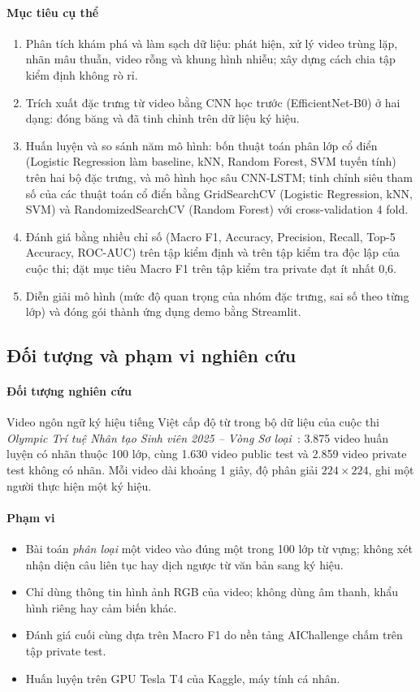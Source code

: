 \paragraph*{Mục tiêu cụ thể}
\begin{enumerate}[label=(\arabic*)]
  \item Phân tích khám phá và làm sạch dữ liệu: phát hiện, xử lý video trùng lặp, nhãn mâu thuẫn, video rỗng và khung hình nhiễu; xây dựng cách chia tập kiểm định không rò rỉ.
  \item Trích xuất đặc trưng từ video bằng CNN học trước (EfficientNet-B0) ở hai dạng: đóng băng và đã tinh chỉnh trên dữ liệu ký hiệu.
  \item Huấn luyện và so sánh năm mô hình: bốn thuật toán phân lớp cổ điển (Logistic Regression làm baseline, kNN, Random Forest, SVM tuyến tính) trên hai bộ đặc trưng, và mô hình học sâu CNN-LSTM; tinh chỉnh siêu tham số của các thuật toán cổ điển bằng GridSearchCV (Logistic Regression, kNN, SVM) và RandomizedSearchCV (Random Forest) với cross-validation 4 fold.
  \item Đánh giá bằng nhiều chỉ số (Macro F1, Accuracy, Precision, Recall, Top-5 Accuracy, ROC-AUC) trên tập kiểm định và trên tập kiểm tra độc lập của cuộc thi; đặt mục tiêu Macro F1 trên tập kiểm tra private đạt ít nhất 0,6.
  \item Diễn giải mô hình (mức độ quan trọng của nhóm đặc trưng, sai số theo từng lớp) và đóng gói thành ứng dụng demo bằng Streamlit.
\end{enumerate}

\subsection{Đối tượng và phạm vi nghiên cứu}
\label{subsec:scope}

\paragraph*{Đối tượng nghiên cứu} Video ngôn ngữ ký hiệu tiếng Việt cấp độ từ trong bộ dữ liệu của cuộc thi \textit{Olympic Trí tuệ Nhân tạo Sinh viên 2025 -- Vòng Sơ loại}~\cite{ptit2025}: 3.875 video huấn luyện có nhãn thuộc 100 lớp, cùng 1.630 video public test và 2.859 video private test không có nhãn. Mỗi video dài khoảng 1 giây, độ phân giải $224\times224$, ghi một người thực hiện một ký hiệu.

\paragraph*{Phạm vi}
\begin{itemize}
  \item Bài toán \emph{phân loại} một video vào đúng một trong 100 lớp từ vựng; không xét nhận diện câu liên tục hay dịch ngược từ văn bản sang ký hiệu.
  \item Chỉ dùng thông tin hình ảnh RGB của video; không dùng âm thanh, khẩu hình riêng hay cảm biến khác.
  \item Đánh giá cuối cùng dựa trên Macro F1 do nền tảng AIChallenge chấm trên tập private test.
  \item Huấn luyện trên GPU Tesla T4 của Kaggle, máy tính cá nhân.
\end{itemize}

